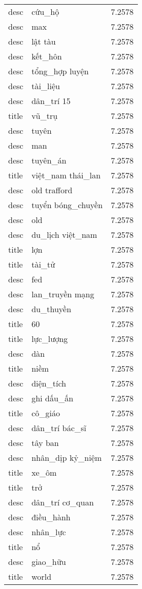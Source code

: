 \documentclass{article}
\begin{document}
\begin{tabular}{lll}
desc & cứu\_hộ & 7.2578\\
desc & max & 7.2578\\
desc & lật tàu & 7.2578\\
desc & kết\_hôn & 7.2578\\
desc & tổng\_hợp luyện & 7.2578\\
desc & tài\_liệu & 7.2578\\
desc & dân\_trí 15 & 7.2578\\
title & vũ\_trụ & 7.2578\\
desc & tuyên & 7.2578\\
desc & man & 7.2578\\
desc & tuyên\_án & 7.2578\\
title & việt\_nam thái\_lan & 7.2578\\
desc & old trafford & 7.2578\\
desc & tuyển bóng\_chuyền & 7.2578\\
desc & old & 7.2578\\
desc & du\_lịch việt\_nam & 7.2578\\
title & lợn & 7.2578\\
title & tài\_tử & 7.2578\\
desc & fed & 7.2578\\
desc & lan\_truyền mạng & 7.2578\\
desc & du\_thuyền & 7.2578\\
title & 60 & 7.2578\\
title & lực\_lượng & 7.2578\\
desc & dàn & 7.2578\\
title & niềm & 7.2578\\
desc & diện\_tích & 7.2578\\
desc & ghi dấu\_ấn & 7.2578\\
title & cô\_giáo & 7.2578\\
desc & dân\_trí bác\_sĩ & 7.2578\\
desc & tây ban & 7.2578\\
desc & nhân\_dịp kỷ\_niệm & 7.2578\\
title & xe\_ôm & 7.2578\\
title & trở & 7.2578\\
desc & dân\_trí cơ\_quan & 7.2578\\
desc & điều\_hành & 7.2578\\
desc & nhân\_lực & 7.2578\\
title & nổ & 7.2578\\
desc & giao\_hữu & 7.2578\\
title & world & 7.2578\\

\end{tabular}
\end{document}
